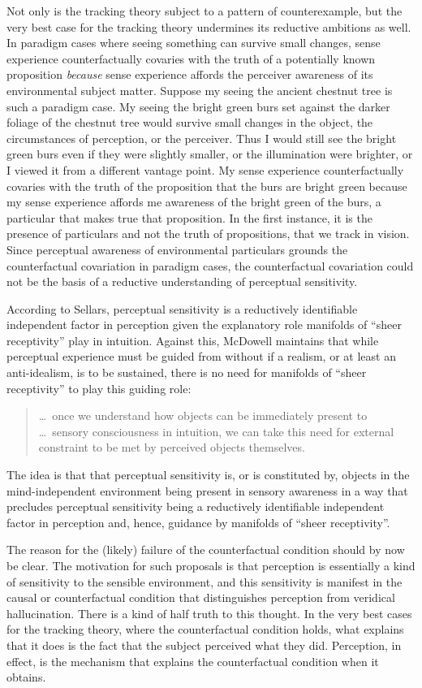 \documentclass[12pt]{article}
\begin{document}
Not only is the tracking theory subject to a pattern of counterexample, but the very best case for the tracking theory undermines its reductive ambitions as well. In paradigm cases where seeing something can survive small changes, sense experience counterfactually covaries with the truth of a potentially known proposition \emph{because} sense experience affords the perceiver awareness of its environmental subject matter. Suppose my seeing the ancient chestnut tree is such a paradigm case. My seeing the bright green burs set against the darker foliage of the chestnut tree would survive small changes in the object, the circumstances of perception, or the perceiver. Thus I would still see the bright green burs even if they were slightly smaller, or the illumination were brighter, or I viewed it from a different vantage point. My sense experience counterfactually covaries with the truth of the proposition that the burs are bright green because my sense experience affords me awareness of the bright green of the burs, a particular that makes true that proposition. In the first instance, it is the presence of particulars and not the truth of propositions, that we track in vision. Since perceptual awareness of environmental particulars grounds the counterfactual covariation in paradigm cases, the counterfactual covariation could not be the basis of a reductive understanding of perceptual sensitivity.

According to Sellars, perceptual sensitivity is a reductively identifiable independent factor in perception given the explanatory role manifolds of ``sheer receptivity'' play in intuition. Against this, McDowell maintains that while perceptual experience must be guided from without if a realism, or at least an anti-idealism, is to be sustained, there is no need for manifolds of ``sheer receptivity'' to play this guiding role:
\begin{quote}
    \ldots\ once we understand how objects can be immediately present to \ldots\ sensory consciousness in intuition, we can take this need for external constraint to be met by perceived objects themselves. \citep[46]{McDowell:1998vn}
\end{quote}
The idea is that that perceptual sensitivity is, or is constituted by, objects in the mind-independent environment being present in sensory awareness in a way that precludes perceptual sensitivity being a reductively identifiable independent factor in perception and, hence, guidance by manifolds of ``sheer receptivity''.

The reason for the (likely) failure of the counterfactual condition should by now be clear. The motivation for such proposals is that perception is essentially a kind of sensitivity to the sensible environment, and this sensitivity is manifest in the causal or counterfactual condition that distinguishes perception from veridical hallucination. There is a kind of half truth to this thought. In the very best cases for the tracking theory, where the counterfactual condition holds, what explains that it does is the fact that the subject perceived what they did. Perception, in effect, is the mechanism that explains the counterfactual condition when it obtains. 
\end{document}
